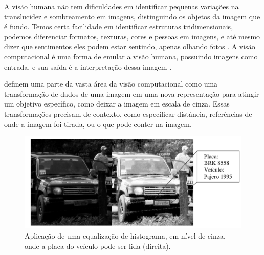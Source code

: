 A visão humana não tem dificuldades em identificar pequenas variações na translucidez e sombreamento em imagens, distinguindo os objetos da imagem que é fundo. Temos certa facilidade em identificar estruturas tridimensionais, podemos diferenciar formatos, texturas, cores e pessoas em imagens, e até mesmo dizer que sentimentos eles podem estar sentindo, apenas olhando fotos \cite{szeliski2010computer}.
% 
A visão computacional é uma forma de emular a visão humana, possuindo imagens como entrada, e sua saída é a interpretação dessa imagem \cite{marengoni:2009}.

 definem uma parte da vasta área da visão computacional como uma transformação de dados de uma imagem em uma nova representação para atingir um objetivo específico, como deixar a imagem em escala de cinza. Essas transformações precisam de contexto, como especificar distância, referências de onde a imagem foi tirada, ou o que pode conter na imagem.
\begin{figure}[h]
	\caption{\label{fig:grayscaleex}Aplicação de uma equalização de histograma, em nível de cinza, onde a placa do veículo pode ser lida (direita).}
	\begin{center}
	    \includegraphics[width=.7\textwidth]{resources/grayscaleex}
	\end{center}
\end{figure}


